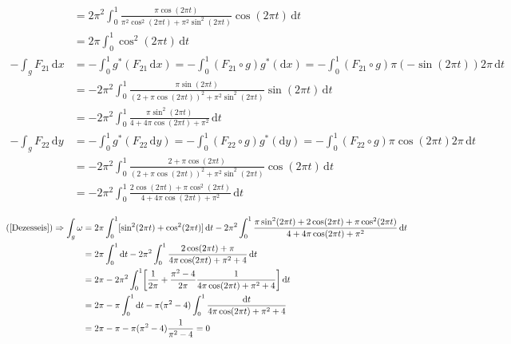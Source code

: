 \documentclass[12pt,a4paper]{article}
\begin{document}
\begin{align}
			&= 2\pi^2 \int_0^1 \frac{\pi \cos(2\pi t)}{\pi^2 \cos^2(2\pi t) + \pi^2 \sin^2(2\pi t)} \cos(2\pi t) \,\mathrm{d}t \\
			&= 2\pi \int_0^1 \cos^2(2\pi t) \,\mathrm{d}t \\
			- \int_g F_{21} \,\mathrm{d}x &= - \int_0^1 g^*(F_{21} \,\mathrm{d}x) = - \int_0^1 (F_{21} \circ g) g^*(\mathrm{d}x) = - \int_0^1 (F_{21} \circ g) \pi (-\sin (2\pi t)) 2\pi \,\mathrm{d}t \\
			&= - 2\pi^2 \int_0^1 \frac{\pi \sin(2\pi t)}{(2 + \pi \cos(2\pi t))^2 + \pi^2 \sin^2(2\pi t)} \sin (2\pi t) \,\mathrm{d}t \\
			&= - 2\pi^2 \int_0^1 \frac{\pi \sin^2(2\pi t)}{4 + 4 \pi \cos(2\pi t) + \pi^2} \,\mathrm{d}t \\
			- \int_g F_{22} \,\mathrm{d}y &= - \int_0^1 g^*(F_{22} \,\mathrm{d}y) = - \int_0^1 (F_{22} \circ g) g^*(\mathrm{d}y) = - \int_0^1 (F_{22} \circ g) \pi \cos(2\pi t) 2\pi \,\mathrm{d}t \\
			&= - 2 \pi^2 \int_0^1 \frac{2 + \pi \cos(2\pi t)}{(2 + \pi \cos(2\pi t))^2 + \pi^2 \sin^2(2\pi t)} \cos(2\pi t) \,\mathrm{d}t \\
			&= - 2 \pi^2 \int_0^1 \frac{2\cos(2\pi t) + \pi \cos^2(2\pi t)}{4 + 4 \pi \cos(2\pi t) + \pi^2} \,\mathrm{d}t
		\end{align}

		\begin{align}
			(\ref{Dezesseis}) \Rightarrow \int_g \omega &= 2\pi \int_0^1 [ \sin^2 (2\pi t) + \cos^2 (2\pi t) ] \,\mathrm{d}t - 2\pi^2 \int_0^1 \frac{\pi \sin^2(2\pi t) + 2\cos(2\pi t) + \pi \cos^2(2\pi t)}{4 + 4 \pi \cos(2\pi t) + \pi^2} \,\mathrm{d}t \\
			&= 2\pi \int_0^1 \mathrm{d}t - 2\pi^2 \int_0^1 \frac{2\cos(2\pi t) + \pi}{4 \pi \cos(2\pi t) + \pi^2 + 4} \,\mathrm{d}t \\
			&= 2\pi - 2\pi^2 \int_0^1 \biggl[\frac{1}{2\pi} + \frac{\pi^2 - 4}{2\pi} \frac{1}{4 \pi \cos(2\pi t) + \pi^2 + 4} \biggl] \,\mathrm{d}t \\
			&= 2\pi - \pi \int_0^1 \mathrm{d}t - \pi (\pi^2-4) \int_0^1 \frac{\mathrm{d}t}{4 \pi \cos(2\pi t) + \pi^2 + 4} \\
			&= 2\pi - \pi - \pi (\pi^2-4) \frac{1}{\pi^2 - 4} = 0
		\end{align}

		\begin{flushright}
		\end{flushright}
\end{document}
